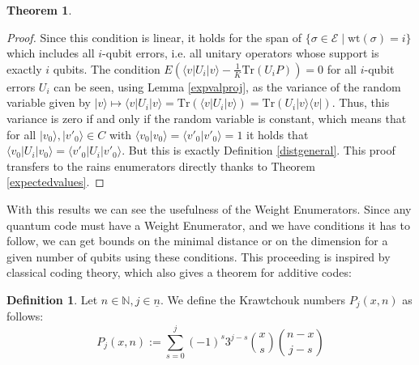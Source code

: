 \documentclass[12pt,a4paper,BCOR15mm,twoside,DIV12]{article}
\def\E{\mathcal{E}}
\def\N{\mathbb{N}}
\def\n{\underline{n}}
\def\Tr{\text{Tr}}
\def\wt{\text{wt}}
\theoremstyle{definition}
\newtheorem{theorem}[Satz]{Theorem}
\newtheorem{defn}[Satz]{Definition}
\begin{document}
\begin{theorem}
\begin{proof}
Since this condition is linear, it holds for the span of $\{ \sigma \in \E \mid \wt(\sigma) = i \}$ which includes all $i$-qubit errors, i.e. all unitary operators whose support is exactly $i$ qubits.
The condition $E(\langle v | U_i | v \rangle - \frac{1}{K}\Tr(U_i P)) = 0$ for all $i$-qubit errors $U_i$ can be seen, using Lemma \ref{expvalproj}, as the variance of the random variable given by $| v \rangle \mapsto  \langle v | U_i | v \rangle  = \Tr(\langle v | U_i | v \rangle) = \Tr( U_i | v \rangle \langle v |)$.
Thus, this variance is zero if and only if the random variable is constant, which means that for all $ |v_0 \rangle, |v'_0 \rangle \in C$ with $\langle v_0 | v_0 \rangle = \langle v'_0 | v'_0 \rangle = 1$ it holds that $\langle v_0 | U_i | v_0 \rangle = \langle v'_0 | U_i | v'_0 \rangle$.
But this is exactly Definition \ref{distgeneral}. This proof transfers to the rains enumerators directly thanks to Theorem \ref{expectedvalues}.

\end{proof}

\end{theorem}

With this results we can see the usefulness of the Weight Enumerators. Since any quantum code must have a Weight Enumerator, and we have conditions it has to follow, we can get bounds on the minimal distance or on the dimension for a given number of qubits using these conditions.
This proceeding is inspired by classical coding theory, which also gives a theorem for additive codes:

\begin{defn}
Let $n \in \N, j \in \n$. We define the Krawtchouk numbers $P_j(x,n)$ as follows: 
\begin{equation}
P_j(x,n) := \sum_{s=0}^j (-1)^s 3^{j-s} \binom{x}{s}\binom{n-x}{j-s}
\end{equation}
\end{defn}
\end{document}

